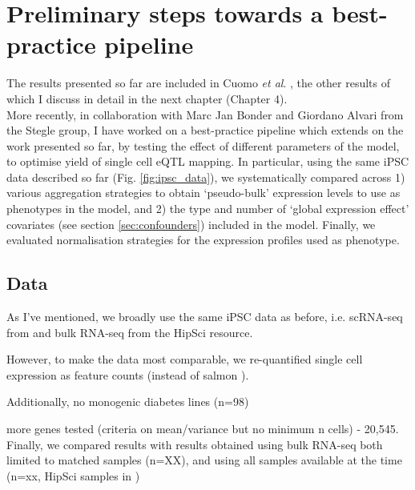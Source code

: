 \clearpage

\section{Preliminary steps towards a best-practice pipeline}

The results presented so far are included in Cuomo \textit{et al}. \cite{cuomo2020single}, the other results of which I discuss in detail in the next chapter (Chapter 4). \\

More recently, in collaboration with Marc Jan Bonder and Giordano Alvari from the Stegle group, I have worked on a best-practice pipeline which extends on the work presented so far, by testing the effect of different parameters of the model, to optimise yield of single cell eQTL mapping.
In particular, using the same iPSC data described so far (Fig. \ref{fig:ipsc_data}), we systematically compared across 1) various aggregation strategies to obtain `pseudo-bulk' expression levels to use as phenotypes in the model, and 2)
the type and number of `global expression effect' covariates (see section \ref{sec:confounders}) included in the model.
Finally, we evaluated normalisation strategies for the expression profiles used as phenotype.

\subsection{Data}

As I've mentioned, we broadly use the same iPSC data as before, i.e. scRNA-seq from \cite{cuomo2020single} and bulk RNA-seq from the HipSci resource.

However, to make the data most comparable, we re-quantified single cell expression as feature counts (instead of salmon \cite{patro2017salmon}).

Additionally, no monogenic diabetes lines (n=98)

more genes tested (criteria on mean/variance but no minimum n cells) - 20,545. \\

Finally, we compared results with results obtained using bulk RNA-seq both limited to matched samples (n=XX), and using all samples available at the time (n=xx, HipSci samples in \cite{bonder2019systematic}) 



